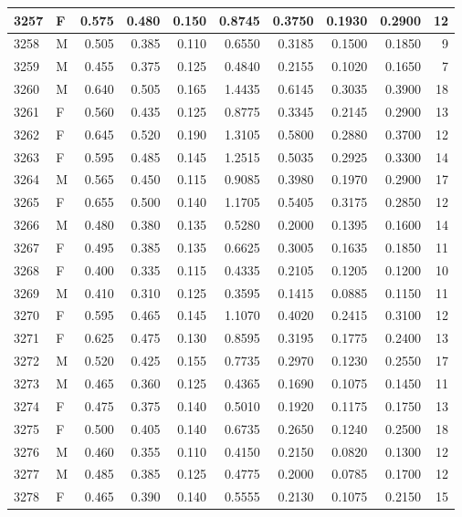 \documentclass[9pt,twocolumn,twoside,]{pnas-new}
\begin{document}
\begin{tabular}{l|l|r|r|r|r|r|r|r|r}
\hline
3257 & F & 0.575 & 0.480 & 0.150 & 0.8745 & 0.3750 & 0.1930 & 0.2900 & 12\\
\hline
3258 & M & 0.505 & 0.385 & 0.110 & 0.6550 & 0.3185 & 0.1500 & 0.1850 & 9\\
\hline
3259 & M & 0.455 & 0.375 & 0.125 & 0.4840 & 0.2155 & 0.1020 & 0.1650 & 7\\
\hline
3260 & M & 0.640 & 0.505 & 0.165 & 1.4435 & 0.6145 & 0.3035 & 0.3900 & 18\\
\hline
3261 & F & 0.560 & 0.435 & 0.125 & 0.8775 & 0.3345 & 0.2145 & 0.2900 & 13\\
\hline
3262 & F & 0.645 & 0.520 & 0.190 & 1.3105 & 0.5800 & 0.2880 & 0.3700 & 12\\
\hline
3263 & F & 0.595 & 0.485 & 0.145 & 1.2515 & 0.5035 & 0.2925 & 0.3300 & 14\\
\hline
3264 & M & 0.565 & 0.450 & 0.115 & 0.9085 & 0.3980 & 0.1970 & 0.2900 & 17\\
\hline
3265 & F & 0.655 & 0.500 & 0.140 & 1.1705 & 0.5405 & 0.3175 & 0.2850 & 12\\
\hline
3266 & M & 0.480 & 0.380 & 0.135 & 0.5280 & 0.2000 & 0.1395 & 0.1600 & 14\\
\hline
3267 & F & 0.495 & 0.385 & 0.135 & 0.6625 & 0.3005 & 0.1635 & 0.1850 & 11\\
\hline
3268 & F & 0.400 & 0.335 & 0.115 & 0.4335 & 0.2105 & 0.1205 & 0.1200 & 10\\
\hline
3269 & M & 0.410 & 0.310 & 0.125 & 0.3595 & 0.1415 & 0.0885 & 0.1150 & 11\\
\hline
3270 & F & 0.595 & 0.465 & 0.145 & 1.1070 & 0.4020 & 0.2415 & 0.3100 & 12\\
\hline
3271 & F & 0.625 & 0.475 & 0.130 & 0.8595 & 0.3195 & 0.1775 & 0.2400 & 13\\
\hline
3272 & M & 0.520 & 0.425 & 0.155 & 0.7735 & 0.2970 & 0.1230 & 0.2550 & 17\\
\hline
3273 & M & 0.465 & 0.360 & 0.125 & 0.4365 & 0.1690 & 0.1075 & 0.1450 & 11\\
\hline
3274 & F & 0.475 & 0.375 & 0.140 & 0.5010 & 0.1920 & 0.1175 & 0.1750 & 13\\
\hline
3275 & F & 0.500 & 0.405 & 0.140 & 0.6735 & 0.2650 & 0.1240 & 0.2500 & 18\\
\hline
3276 & M & 0.460 & 0.355 & 0.110 & 0.4150 & 0.2150 & 0.0820 & 0.1300 & 12\\
\hline
3277 & M & 0.485 & 0.385 & 0.125 & 0.4775 & 0.2000 & 0.0785 & 0.1700 & 12\\
\hline
3278 & F & 0.465 & 0.390 & 0.140 & 0.5555 & 0.2130 & 0.1075 & 0.2150 & 15\\

\end{tabular}
\end{document}
